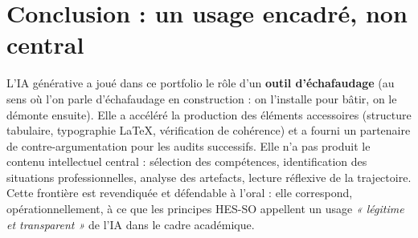 \section{Conclusion : un usage encadré, non central}

L'IA générative a joué dans ce portfolio le rôle d'un \textbf{outil d'échafaudage} (au sens où l'on parle d'échafaudage en construction : on l'installe pour bâtir, on le démonte ensuite). Elle a accéléré la production des éléments accessoires (structure tabulaire, typographie \LaTeX{}, vérification de cohérence) et a fourni un partenaire de contre-argumentation pour les audits successifs. Elle n'a pas produit le contenu intellectuel central : sélection des compétences, identification des situations professionnelles, analyse des artefacts, lecture réflexive de la trajectoire. Cette frontière est revendiquée et défendable à l'oral : elle correspond, opérationnellement, à ce que les principes HES-SO appellent un usage \emph{« légitime et transparent »} de l'IA dans le cadre académique.
